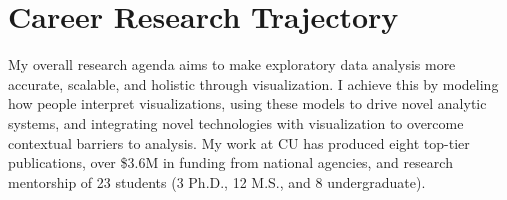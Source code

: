 \documentclass[11pt]{article}
\begin{document}



\section*{Career Research Trajectory}

My overall research agenda aims to 
make exploratory data analysis more accurate, scalable, and holistic through visualization. I achieve this by modeling how people interpret visualizations, using these models to drive novel analytic systems, and integrating novel technologies with visualization to overcome contextual barriers to analysis. My work at CU has produced eight top-tier publications, over \$3.6M in funding from national agencies, and research mentorship of 23 students (3 Ph.D., 12 M.S., and 8 undergraduate). 
\end{document}
